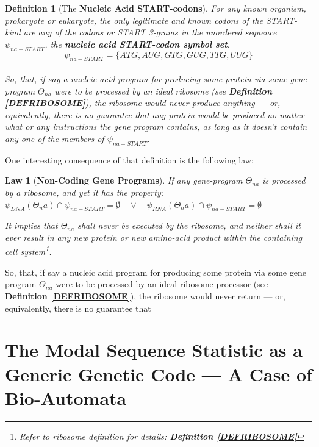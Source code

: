 \documentclass[a4paper, 18pt]{article} %
\newtheorem{defn}{Definition}
\newtheorem{law}{Law}
\begin{document}
\begin{defn}[The \textbf{Nucleic Acid START-codons}]
For any known organism, prokaryote or eukaryote, the only legitimate and known codons of the START-kind are any of the codons or START 3-grams in the unordered sequence $\psi_{na-START}$, the \textbf{nucleic acid START-codon symbol set}.\\

\begin{equation}
\label{EQNNASSS}
\psi_{na-START} = \{ATG,AUG,GTG,GUG,TTG,UUG\}
\end{equation}\\

So, that, if say a nucleic acid program for producing some protein via some gene program $\Theta_{na}$ were to be processed by an ideal ribosome (see \textbf{Definition \ref{DEFRIBOSOME}}), the ribosome would never produce anything --- or, equivalently, there is no guarantee that any protein would be produced no matter what or any instructions the gene program contains, as long as it doesn't contain any one of the members of $\psi_{na-START}$.
\end{defn} 

One interesting consequence of that definition is the following law:

\begin{law}[\textbf{Non-Coding Gene Programs}]
If any gene-program $\Theta_{na}$ is processed by a ribosome, and yet it has the property:\\

 $\psi_{DNA}(\Theta_na) \cap \psi_{na-START} = \emptyset \quad \lor \quad \psi_{RNA}(\Theta_na) \cap \psi_{na-START} = \emptyset$
 
It implies that $\Theta_{na}$ shall never be executed by the ribosome, and neither shall it ever result in any new protein or new amino-acid product within the containing cell system\footnote{Refer to ribosome definition for details: \textbf{Definition \ref{DEFRIBOSOME}}}.
\end{law}


So, that, if say a nucleic acid program for producing some protein via some gene program $\Theta_{na}$ were to be processed by an ideal ribosome processor (see \textbf{Definition \ref{DEFRIBOSOME}}), the ribosome would never return --- or, equivalently, there is no guarantee that


\section{The Modal Sequence Statistic as a Generic Genetic Code --- A Case of Bio-Automata}
\label{SEC4}
\end{document}
